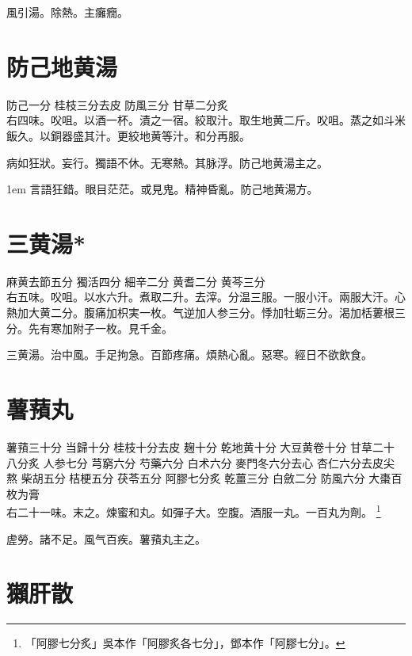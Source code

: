 風引湯。除熱{\khaaitp 。主}癱癇。

\section{防己地黄湯}

防己{\scriptsize 一分} 桂枝{\scriptsize 三分去皮} 防風{\scriptsize 三分} 甘草{\scriptsize 二分炙}\\
右四味。㕮咀。以酒一杯。漬之一宿。絞取汁。取生地黄二斤。㕮咀。蒸之如斗米飯久。以銅器盛其汁。更絞地黄等汁。和分再服。

病如狂狀。妄行。獨語不休。无寒熱。其脉浮。防己地黄湯主之。

\hangindent 1em
言語狂錯。眼目茫茫。或見鬼。精神昏亂。防己地黄湯方。{\qianjin}

\section{三黄湯*}

麻黄{\scriptsize 去節五分} 獨活{\scriptsize 四分} 細辛{\scriptsize 二分} 黄耆{\scriptsize 二分} 黄芩{\scriptsize 三分}\\
右五味。㕮咀。以水六升。煮取二升。去滓。分温三服。一服小汗。兩服大汗。心熱加大黄二分。腹痛加枳実一枚。气逆加人参三分。悸加牡蛎三分。渴加栝蔞根三分。先有寒加附子一枚。{\scriptsize 見千金。}

三黄湯。治中風。手足拘急。百節疼痛。煩熱心亂。惡寒。經日不欲飲食。

\section{薯蕷丸}

薯蕷{\scriptsize 三十分} 当歸{\scriptsize 十分} 桂枝{\scriptsize 十分去皮} 麹{\scriptsize 十分} 乾地黄{\scriptsize 十分} 大豆黄卷{\scriptsize 十分} 甘草{\scriptsize 二十八分炙} 人参{\scriptsize 七分} 芎窮{\scriptsize 六分} 芍藥{\scriptsize 六分} 白术{\scriptsize 六分} 麥門冬{\scriptsize 六分去心} 杏仁{\scriptsize 六分去皮尖熬} 柴胡{\scriptsize 五分} 桔梗{\scriptsize 五分} 茯苓{\scriptsize 五分} 阿膠{\scriptsize 七分炙} 乾薑{\scriptsize 三分} 白斂{\scriptsize 二分} 防風{\scriptsize 六分} 大棗{\scriptsize 百枚为膏}\\
右二十一味。末之。煉蜜和丸。如彈子大。空腹。酒服一丸。一百丸为劑。
	\footnote{
		「阿膠七分炙」吳本作「阿膠炙各七分」，鄧本作「阿膠七分」。
	}

虗勞。諸不足。風气百疾。薯蕷丸主之。

\section{獺肝散}

